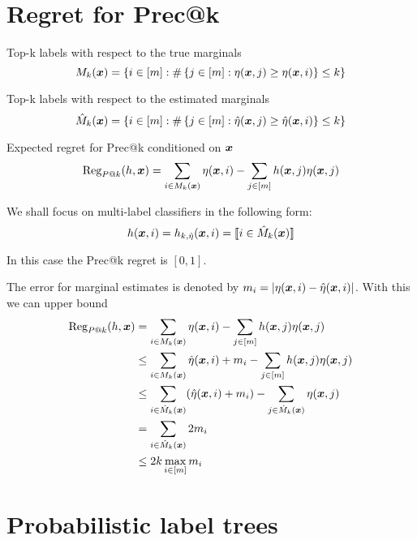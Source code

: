 \documentclass{article}
\begin{document}
\newpage






\appendix

\onecolumn

\section{Regret for Prec@k}
Top-k labels with respect to the true marginals
\[
M_k(\boldsymbol{x}) = \left\{ i\in [m] : \# \left\{ j \in [m] : \eta(\boldsymbol{x}, j) \ge \eta(\boldsymbol{x}, i)  \right\} \le k\right\}
\]

Top-k labels with respect to the estimated marginals
\[
\hat{M}_k(\boldsymbol{x}) = \left\{ i\in [m] : \# \left\{ j \in [m] : \hat{\eta}(\boldsymbol{x}, j) \ge \hat{\eta}(\boldsymbol{x}, i)  \right\} \le k\right\}
\]


Expected regret for Prec@k conditioned on $\boldsymbol{x}$ 
\[
\mbox{Reg}_{P@k} (h, \boldsymbol{x}) = \sum_{i \in M_k(\boldsymbol{x})} \eta (\boldsymbol{x} ,i ) - \sum_{j \in [m]} h(\boldsymbol{x}, j) \eta(\boldsymbol{x} , j )
\]

We shall focus on multi-label classifiers in the following form:
\[
h(\boldsymbol{x},i) =h_{k, \hat{\eta}}(\boldsymbol{x},i) = \llbracket \textstyle i \in \hat{M}_k(\boldsymbol{x})  \rrbracket
\]

In this case the Prec@k regret is $[0,1]$.

The error for marginal estimates is denoted by $m_i = \vert \eta (\boldsymbol{x} ,i ) - \hat{\eta} (\boldsymbol{x} ,i )\vert$. With this we can upper bound 
\begin{align}
\mbox{Reg}_{P@k} (h, \boldsymbol{x}) 
  & = \sum_{i \in M_k(\boldsymbol{x})} \eta (\boldsymbol{x} ,i ) - \sum_{j \in [m]} h(\boldsymbol{x}, j) \eta(\boldsymbol{x} , j ) \notag \\
  & \le \sum_{i \in M_k(\boldsymbol{x})} \hat{\eta} (\boldsymbol{x} ,i ) + m_i - \sum_{j \in [m]} h(\boldsymbol{x}, j) \eta(\boldsymbol{x} , j ) \notag \\ 
  & \le \sum_{i \in \hat{M}_k(\boldsymbol{x})} (\hat{\eta} (\boldsymbol{x} ,i ) + m_i )- \sum_{j \in \hat{M}_k(\boldsymbol{x})}  \eta(\boldsymbol{x} , j ) \notag \\
  & = \sum_{i \in \hat{M}_k(\boldsymbol{x})} 2m_i \notag \\
  & \le 2k\max_{i \in [m]} m_i
\end{align}

\section{Probabilistic label trees}
\label{app:plt}
\end{document}
